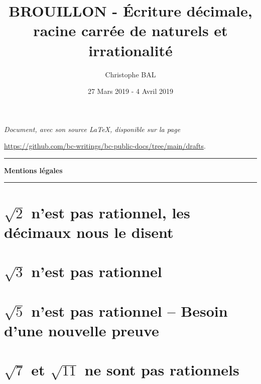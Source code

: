 \documentclass[12pt]{amsart}
\begin{document}
\title{BROUILLON - Écriture décimale, racine carrée de naturels et irrationalité}
\author{Christophe BAL}
\date{27 Mars 2019 - 4 Avril 2019}

\maketitle

\begin{center}
	\itshape
	Document, avec son source \LaTeX, disponible sur la page

	\url{https://github.com/bc-writings/bc-public-docs/tree/main/drafts}.
\end{center}


\bigskip


\begin{center}
	\hrule\vspace{.3em}
	{
		\fontsize{1.35em}{1em}\selectfont
		\textbf{Mentions \og légales \fg}
	}

	\vspace{0.45em}
	\doclicenseThis
	\hrule
\end{center}


\setcounter{tocdepth}{2}
\tableofcontents



\section{$\sqrt2$ n'est pas rationnel, les décimaux nous le disent}





\section{$\sqrt3$ n'est pas rationnel}




\section{$\sqrt5$ n'est pas rationnel -- Besoin d'une nouvelle preuve}





\section{$\sqrt7$ et $\sqrt{11}$ ne sont pas rationnels}
\end{document}
